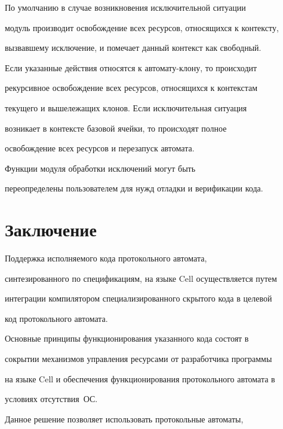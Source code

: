       


      По умолчанию в случае возникновения исключительной ситуации 


модуль производит освобождение всех ресурсов, относящихся к контексту, 


вызвавшему исключение, и помечает данный контекст как свободный. 


Если указанные действия относятся к автомату-клону, то происходит 


рекурсивное освобождение всех ресурсов, относящихся к контекстам 


текущего и вышележащих клонов. Если исключительная ситуация 


возникает в контексте базовой ячейки, то происходят полное 


освобождение всех ресурсов и перезапуск автомата.


      


      Функции модуля обработки исключений могут быть 


переопределены пользователем для нужд отладки и верификации кода.


      


\section{Заключение}


      


      Поддержка исполняемого кода протокольного автомата, 


синтезированного по спецификациям, на языке Cell осуществляется путем 


интеграции компилятором специализированного скрытого кода в целевой 


код протокольного автомата. 


      


      Основные принципы функционирования указанного кода состоят в 


сокрытии механизмов управления ресурсами от разработчика программы 


на языке Cell и обеспечения функционирования протокольного автомата в 


условиях отсутствия~ОС. 


      


      Данное решение позволяет использовать протокольные автоматы, 


